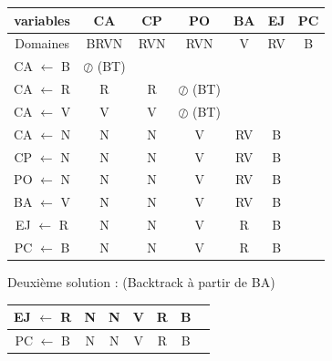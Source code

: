 \documentclass[10pt,a4paper]{article}
\begin{document}
\begin{tabular}{ccccccc}
\hline
variables & CA & CP & PO & BA & EJ & PC \\
\hline
Domaines & BRVN & RVN & RVN & V & RV & B \\
\hline
CA $\leftarrow$ B & $\oslash$ (BT) & & & & &\\
\hline
CA $\leftarrow$ R & R & R & $\oslash$ (BT) & & & \\
\hline
CA $\leftarrow$ V & V & V & $\oslash$ (BT) & & & \\
\hline
CA $\leftarrow$ N & N & N & V & RV & B \\
\hline
CP $\leftarrow$ N & N & N & V & RV & B \\
\hline
PO $\leftarrow$ N & N & N & V & RV & B \\
\hline
BA $\leftarrow$ V & N & N & V & RV & B \\
\hline
EJ $\leftarrow$ R & N & N & V & R & B \\
\hline
PC $\leftarrow$ B & N & N & V & R & B \\
\end{tabular}

Deuxième solution : (Backtrack à partir de BA)\\
\begin{tabular}{ccccccc}
\hline
EJ $\leftarrow$ R & N & N & V & R & B \\
\hline
PC $\leftarrow$ B & N & N & V & R & B \\
\end{tabular}
\end{document}
